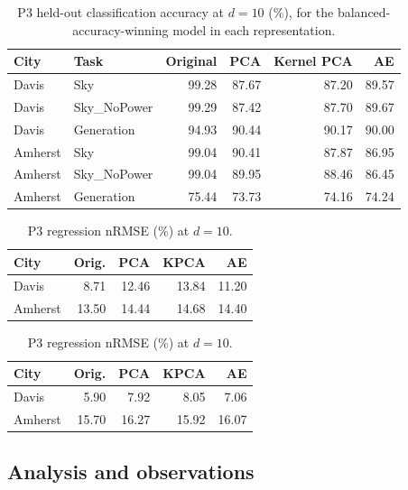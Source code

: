 \documentclass[11pt,letterpaper]{article}
\begin{document}
\begin{table}[!htbp]\centering\footnotesize
\caption{P3 held-out classification accuracy at $d=10$ (\%), for the balanced-accuracy-winning model in each representation.}\label{tab:p3acc}
\begin{tabular}{@{}llrrrr@{}}\toprule
\textbf{City} & \textbf{Task} & \textbf{Original} & \textbf{PCA} & \textbf{Kernel PCA} & \textbf{AE}\\\midrule
Davis & Sky & 99.28 & 87.67 & 87.20 & 89.57\\
Davis & Sky\_NoPower & 99.29 & 87.42 & 87.70 & 89.67\\
Davis & Generation & 94.93 & 90.44 & 90.17 & 90.00\\
Amherst & Sky & 99.04 & 90.41 & 87.87 & 86.95\\
Amherst & Sky\_NoPower & 99.04 & 89.95 & 88.46 & 86.45\\
Amherst & Generation & 75.44 & 73.73 & 74.16 & 74.24\\
\bottomrule\end{tabular}
\end{table}
\begin{table}[!htbp]\centering\footnotesize
\begin{minipage}[t]{0.48\textwidth}\centering
\caption{P3 regression MAE (kW) at $d=10$.}\label{tab:p3mae}
\begin{tabular}{@{}lrrrr@{}}\toprule
\textbf{City} & \textbf{Orig.} & \textbf{PCA} & \textbf{KPCA} & \textbf{AE}\\\midrule
Davis & 8.71 & 12.46 & 13.84 & 11.20\\
Amherst & 13.50 & 14.44 & 14.68 & 14.40\\
\bottomrule\end{tabular}
\end{minipage}\hfill
\begin{minipage}[t]{0.48\textwidth}\centering
\caption{P3 regression nRMSE (\%) at $d=10$.}\label{tab:p3nrmse}
\begin{tabular}{@{}lrrrr@{}}\toprule
\textbf{City} & \textbf{Orig.} & \textbf{PCA} & \textbf{KPCA} & \textbf{AE}\\\midrule
Davis & 5.90 & 7.92 & 8.05 & 7.06\\
Amherst & 15.70 & 16.27 & 15.92 & 16.07\\
\bottomrule\end{tabular}
\end{minipage}
\end{table}

\subsection{Analysis and observations}
\end{document}
